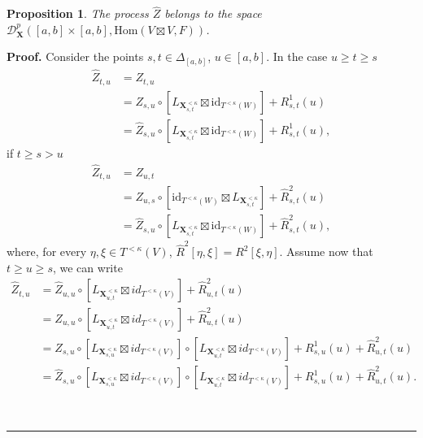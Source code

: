 \documentclass{article}%
\newtheorem{proposition}[theorem]{Proposition}
\newenvironment{proof}[1][Proof]{\noindent\textbf{#1.} }{\ \rule{0.5em}{0.5em}}
\begin{document}
\begin{proposition}
The process $ \hat{Z}$ belongs to the space  $\mathcal{D}^{p}_{\mathbf{X}}\left([a,b] \times [a,b], \mathrm{Hom}(V \boxtimes V, F)\right)$.
\end{proposition}
\begin{proof}
Consider the points $s,t \in \Delta_{[a,b]}$, $u \in [a,b]$.
In the case $u \geq t \geq s$
\begin{align*}
\hat{Z}_{t,u} &= Z_{t,u}\\
&= Z_{s,u}\circ\left[  L_{\mathbf{X}_{s,t}^{<\kappa}}\boxtimes
\text{id}_{T^{<\kappa}\left(  W\right)  }\right]  +R_{s,t}^{1}\left(
u\right)\\
&= \hat{Z}_{s,u}\circ\left[  L_{\mathbf{X}_{s,t}^{<\kappa}}\boxtimes
\text{id}_{T^{<\kappa}\left(  W\right)  }\right]  +R_{s,t}^{1}\left(
u\right),
\end{align*}
if $t \geq s > u$
\begin{align*}
\hat{Z}_{t,u} &= Z_{u,t}\\
&= Z_{u,s}\circ\left[ 
\text{id}_{T^{<\kappa}\left(  W\right)  } \boxtimes L_{\mathbf{X}_{s,t}^{<\kappa}}\right]  +\hat{R}_{s,t}^{2}\left(
u\right)\\
&= \hat{Z}_{s,u}\circ\left[  L_{\mathbf{X}_{s,t}^{<\kappa}}\boxtimes
\text{id}_{T^{<\kappa}\left(  W\right)  }\right]  +\hat{R}_{s,t}^{2}\left(
u\right),
\end{align*}
where, for every $\eta, \xi \in T^{< \kappa}(V)$, $\hat{R}^2[\eta, \xi] = R^2[ \xi, \eta]$.\newline
Assume now that $t \geq  u \geq  s$, we can write 
\begin{align*}
\hat{Z}_{t,u} &= \hat{Z}_{u,u} \circ  \left[ L_{\mathbf{X}^{< \kappa}_{u,t}} \boxtimes id_{T^{< \kappa}(V)} \right] + \hat{R}^2_{u,t}(u) \\
&= Z_{u,u} \circ  \left[ L_{\mathbf{X}^{< \kappa}_{u,t}} \boxtimes id_{T^{< \kappa}(V)} \right] + \hat{R}^2_{u,t}(u) \\
&= Z_{s,u} \circ  \left[ L_{\mathbf{X}^{< \kappa}_{s,u}} \boxtimes id_{T^{< \kappa}(V)} \right] \circ  \left[ L_{\mathbf{X}^{< \kappa}_{u,t}} \boxtimes id_{T^{< \kappa}(V)} \right] + R^1_{s,u}(u) + \hat{R}^2_{u,t}(u)\\
&= \hat{Z}_{s,u} \circ  \left[ L_{\mathbf{X}^{< \kappa}_{s,u}} \boxtimes id_{T^{< \kappa}(V)} \right] \circ  \left[ L_{\mathbf{X}^{< \kappa}_{u,t}} \boxtimes id_{T^{< \kappa}(V)} \right] + R^1_{s,u}(u) + \hat{R}^2_{u,t}(u).
\end{align*}


\end{proof}
\end{document}

